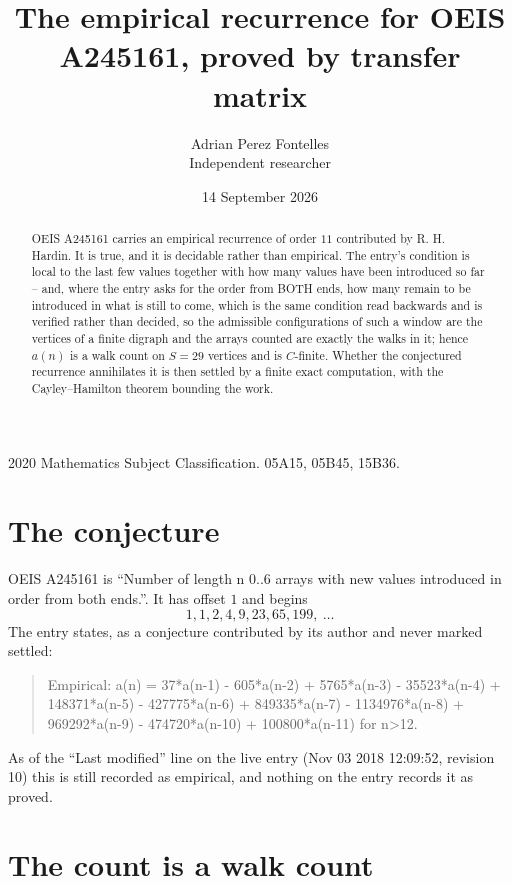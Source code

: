 \documentclass[11pt,a4paper]{article}
\title{The empirical recurrence for OEIS A245161, proved by transfer matrix}
\author{Adrian Perez Fontelles\\ \small Independent researcher}
\date{14 September 2026}
\theoremstyle{plain}
\theoremstyle{definition}
\begin{document}
\maketitle

\begin{abstract}
OEIS A245161 carries an empirical recurrence of order $11$ contributed by R. H. Hardin. It is
true, and it is decidable rather than empirical. The entry's condition is local to the last few values together with how many values have been introduced so far -- and, where the entry asks for the order from BOTH ends, how many remain to be introduced in what is still to come, which is the same condition read backwards and is verified rather than decided, so
the admissible configurations of such a window are the vertices of a finite digraph and the
arrays counted are exactly the walks in it; hence $a(n)$ is a walk count on $S=29$ vertices
and is $C$-finite. Whether the conjectured recurrence annihilates it is then settled by a
finite exact computation, with the Cayley--Hamilton theorem bounding the work.
\end{abstract}

\noindent\small 2020 Mathematics Subject Classification. 05A15, 05B45, 15B36.\normalsize

\section{The conjecture}

OEIS A245161 is ``Number of length n 0..6 arrays with new values introduced in order from both ends.''. It has offset $1$ and begins
\[
1, 1, 2, 4, 9, 23, 65, 199,\ \dots
\]
The entry states, as a conjecture contributed by its author and never marked settled:
\begin{quote}
Empirical: a(n) = 37*a(n-1) - 605*a(n-2) + 5765*a(n-3) - 35523*a(n-4) + 148371*a(n-5) - 427775*a(n-6) + 849335*a(n-7) - 1134976*a(n-8) + 969292*a(n-9) - 474720*a(n-10) + 100800*a(n-11) for n>12.
\end{quote}
As of the ``Last modified'' line on the live entry (Nov 03 2018 12:09:52, revision 10) this is still
recorded as empirical, and nothing on the entry records it as proved.

\section{The count is a walk count}
\end{document}
